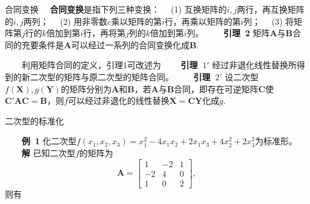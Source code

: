 \documentclass[compress,mathserif,cjk]{beamer}
\theoremstyle{remark}
\numberwithin{equation}{section}
\newcommand{\hei}{\bf}      %
\begin{document}
\begin{CJK}{UTF8}{gbsn}
\begin{frame}{合同变换}
\ \ {\hei 合同变换}是指下列三种变换：
\vskip 5pt
\ \ (1) 互换矩阵的$i,j$两行，再互换矩阵的$i,j$两列；
\vskip 5pt
\ \ (2) 用非零数$c$乘以矩阵的第$i$行，再乘以矩阵的第$i$列；
\vskip 5pt
\ \ (3) 将矩阵第$j$行的$k$倍加到第$i$行，再将第$j$列的$k$倍加到第$i$列。
\pause\vskip 10pt
\ \ \ \ {\hei 引理~2} 矩阵$\bm A$与$\bm B$合同的充要条件是$\bm A$可以经过一系列的合同变换化成$\bm B$.
\end{frame}
\begin{frame}
\ \ \ \ 利用矩阵合同的定义，引理1可改述为
\vskip 5pt
\ \ \ \ {\hei 引理~$1'$} 经过非退化线性替换所得到的新二次型的矩阵与原二次型的矩阵合同。
\pause\vskip 5pt
\ \ \ \ {\hei 引理~$2'$} 设二次型$f(\bm X),g(\bm Y)$的矩阵分别为$\bm A$和$\bm B$，若$\bm A$与$\bm B$合同，即存在可逆矩阵$\bm C$使$\bm C'\bm{AC}=\bm B$，则$f$可以经过非退化的线性替换$\bm X=\bm{CY}$化成$g$.
\end{frame}
\begin{frame}{二次型的标准化}

\ \ \ \ {\hei 例~1} 化二次型$f(x_1,x_2,x_3)=x_1^2-4x_1x_2+2x_1x_3+4x_2^2+2x_3^2$为标准形。
\pause\vskip 5pt
\ \ \ \ {\hei 解} 已知二次型$f$的矩阵为
$$\bm A=\left[\begin{matrix}1&-2&1\\-2&4&0\\1&0&2\end{matrix}\right],$$
则有
\end{frame}


\end{CJK}
\end{document}
